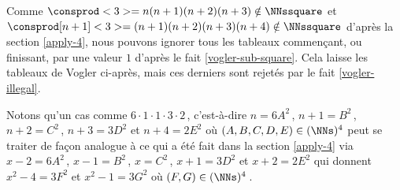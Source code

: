\vspace{-1.5ex}
Comme 
$\consprod<3> = n(n+1)(n+2)(n+3) \notin \NNssquare$ 
et
$\consprod[n+1]<3> = (n+1)(n+2)(n+3)(n+4) \notin \NNssquare$
d'après la section \ref{apply-4},
nous pouvons ignorer tous les tableaux commençant, ou finissant, par une valeur $1$ d'après le fait \ref{vogler-sub-square}. Cela laisse les tableaux de Vogler ci-après, mais ces derniers sont rejetés par le fait \ref{vogler-illegal}.

\begin{center}
\end{center}


\begin{remark}
	Notons qu'un cas comme 
	$6 \cdot 1 \cdot 1 \cdot 3 \cdot 2$\,,
	c'est-à-dire
	$n = 6 A^2$\,, $n + 1 = B^2$\,, $n + 2 = C^2$\,, $n + 3 = 3 D^2$ et $n + 4 = 2 E^2$ 
	où $(A, B, C, D, E) \in ( \NNs )^4$
	peut se traiter de façon analogue à ce qui a été fait dans la section \ref{apply-4} via
	$x - 2 = 6 A^2$\,, $x - 1 = B^2$\,, $x = C^2$\,, $x + 1 = 3 D^2$ et $x + 2 = 2 E^2$
	qui donnent
	$x^2 - 4 = 3 F^2$ et $x^2 - 1 = 3 G^2$
	où $(F, G) \in ( \NNs )^4$\,.
\end{remark}

